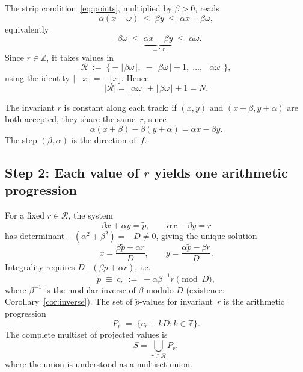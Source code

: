 \documentclass[11pt]{article}
\theoremstyle{plain}
\theoremstyle{definition}
\theoremstyle{remark}
\begin{document}
The strip condition~\eqref{eq:points}, multiplied by \(\beta > 0\), reads
\[
    \alpha(x - \omega) \;\le\; \beta y \;\le\; \alpha x + \beta\omega,
\]
equivalently
\begin{equation}\label{eq:r_range}
    -\beta\omega \;\le\;
    \underbrace{\alpha x - \beta y}_{=:\,r}
    \;\le\; \alpha\omega.
\end{equation}
Since \(r \in \mathbb{Z}\), it takes values in
\begin{equation}\label{eq:R}
    \mathcal{R} \;:=\;
    \bigl\{-\lfloor\beta\omega\rfloor,\;
    -\lfloor\beta\omega\rfloor + 1,\; \ldots,\;
    \lfloor\alpha\omega\rfloor\bigr\},
\end{equation}
using the identity \(\lceil{-x}\rceil = -\lfloor x \rfloor\).
Hence
\[
    |\mathcal{R}| =
    \lfloor\alpha\omega\rfloor + \lfloor\beta\omega\rfloor + 1 = N.
\]

The invariant \(r\) is constant along each track: if \((x, y)\) and
\((x + \beta, y + \alpha)\) are both accepted, they share the same~\(r\),
since
\[
    \alpha(x+\beta) - \beta(y+\alpha) = \alpha x - \beta y.
\]
The step \((\beta, \alpha)\) is the direction of~\(f\).

\subsection{Step 2: Each value of \(r\) yields one arithmetic progression}
\label{subsec:step2}

For a fixed \(r \in \mathcal{R}\), the system
\begin{equation}\label{eq:system}
    \beta x + \alpha y = \tilde{p}, \qquad
    \alpha x - \beta y = r
\end{equation}
has determinant \(-(\alpha^2+\beta^2) = -D \ne 0\), giving the unique solution
\begin{equation}\label{eq:solution}
    x = \frac{\beta\tilde{p} + \alpha r}{D}, \qquad
    y = \frac{\alpha\tilde{p} - \beta r}{D}.
\end{equation}
Integrality requires \(D \mid (\beta\tilde{p} + \alpha r)\), i.e.
\begin{equation}\label{eq:residue}
    \tilde{p} \;\equiv\; c_r \;:=\; -\alpha\beta^{-1}r \pmod{D},
\end{equation}
where \(\beta^{-1}\) is the modular inverse of \(\beta\) modulo \(D\)
(existence: Corollary~\ref{cor:inverse}).
The set of \(\tilde{p}\)-values for invariant~\(r\) is the arithmetic
progression
\begin{equation}\label{eq:Pr}
    P_r \;=\; \{c_r + kD : k \in \mathbb{Z}\}.
\end{equation}
The complete multiset of projected values is
\[
    S = \bigcup_{r \in \mathcal{R}} P_r,
\]
where the union is understood as a multiset union.
\end{document}
